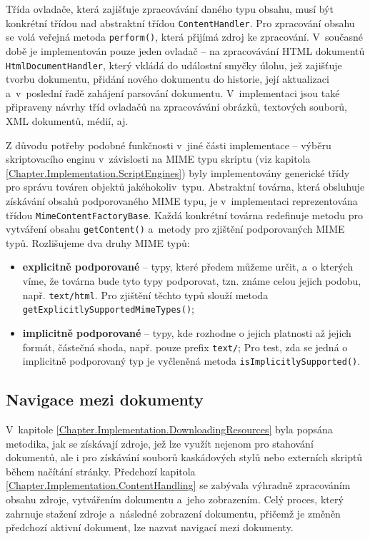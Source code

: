 Třída ovladače, která zajišťuje zpracovávání daného typu obsahu, musí být konkrétní třídou nad abstraktní třídou \texttt{ContentHandler}. Pro zpracování obsahu se volá veřejná metoda \texttt{perform()}, která přijímá zdroj ke zpracování. V~současné době je implementován pouze jeden ovladač -- na zpracovávání HTML dokumentů \texttt{HtmlDocumentHandler}, který vkládá do událostní smyčky úlohu, jež zajišťuje tvorbu dokumentu, přidání nového dokumentu do historie, její aktualizaci a~v~poslední řadě zahájení parsování dokumentu. V~implementaci jsou také připraveny návrhy tříd ovladačů na zpracovávání obrázků, textových souborů, XML dokumentů, médií, aj.

Z důvodu potřeby podobné funkčnosti v~jiné části implementace -- výběru skriptovacího enginu v~závislosti na MIME typu skriptu (viz kapitola \ref{Chapter.Implementation.ScriptEngines}) byly implementovány generické třídy pro správu továren objektů jakéhokoliv~typu. Abstraktní továrna, která obsluhuje získávání obsahů podporovaného MIME typu, je v~implementaci reprezentována třídou \texttt{MimeContentFactoryBase}. Každá konkrétní továrna redefinuje metodu pro vytváření obsahu \texttt{getContent()} a~metody pro zjištění podporovaných MIME typů. Rozlišujeme dva druhy MIME typů:

\begin{itemize}
  \item \textbf{explicitně podporované} -- typy, které předem můžeme určit, a~o kterých víme, že továrna bude tyto typy podporovat, tzn. známe celou jejich podobu, např. \texttt{text/html}. Pro zjištění těchto typů slouží metoda \texttt{getExplicitlySupportedMimeTypes()};
  \item \textbf{implicitně podporované} -- typy, kde rozhodne o jejich platnosti až jejich formát, částečná shoda, např. pouze prefix \texttt{text/}; Pro test, zda se jedná o implicitně podporovaný typ je vyčleněná metoda \texttt{isImplicitlySupported()}.
\end{itemize}

\subsection{Navigace mezi dokumenty}
\label{Chapter.Implementation.DocumentNavigation}

V~kapitole \ref{Chapter.Implementation.DownloadingResources} byla popsána metodika, jak se získávají zdroje, jež lze využít nejenom pro stahování dokumentů, ale i pro získávání souborů kaskádových stylů nebo externích skriptů během načítání stránky. Předchozí kapitola \ref{Chapter.Implementation.ContentHandling} se zabývala výhradně zpracováním obsahu zdroje, vytvářením dokumentu a~jeho zobrazením. Celý proces, který zahrnuje stažení zdroje a~následné zobrazení dokumentu, přičemž je změněn předchozí aktivní dokument, lze nazvat navigací mezi dokumenty.

